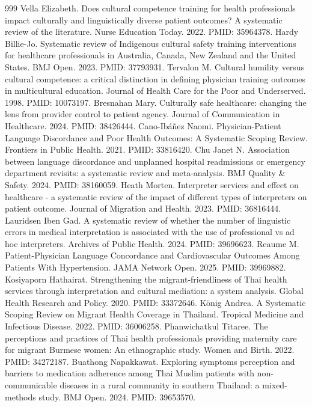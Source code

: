 \begin{thebibliography}{999}
 Vella Elizabeth. Does cultural competence training for health professionals impact culturally and linguistically diverse patient outcomes? A systematic review of the literature. Nurse Education Today. 2022. PMID: 35964378.
 Hardy Billie-Jo. Systematic review of Indigenous cultural safety training interventions for healthcare professionals in Australia, Canada, New Zealand and the United States. BMJ Open. 2023. PMID: 37793931.
 Tervalon M. Cultural humility versus cultural competence: a critical distinction in defining physician training outcomes in multicultural education. Journal of Health Care for the Poor and Underserved. 1998. PMID: 10073197.
 Bresnahan Mary. Culturally safe healthcare: changing the lens from provider control to patient agency. Journal of Communication in Healthcare. 2024. PMID: 38426444.
 Cano-Ibáñez Naomi. Physician-Patient Language Discordance and Poor Health Outcomes: A Systematic Scoping Review. Frontiers in Public Health. 2021. PMID: 33816420.
 Chu Janet N. Association between language discordance and unplanned hospital readmissions or emergency department revisits: a systematic review and meta-analysis. BMJ Quality \& Safety. 2024. PMID: 38160059.
 Heath Morten. Interpreter services and effect on healthcare - a systematic review of the impact of different types of interpreters on patient outcome. Journal of Migration and Health. 2023. PMID: 36816444.
 Lauridsen Iben Gad. A systematic review of whether the number of linguistic errors in medical interpretation is associated with the use of professional vs ad hoc interpreters. Archives of Public Health. 2024. PMID: 39696623.
 Reaume M. Patient-Physician Language Concordance and Cardiovascular Outcomes Among Patients With Hypertension. JAMA Network Open. 2025. PMID: 39969882.
 Kosiyaporn Hathairat. Strengthening the migrant-friendliness of Thai health services through interpretation and cultural mediation: a system analysis. Global Health Research and Policy. 2020. PMID: 33372646.
 König Andrea. A Systematic Scoping Review on Migrant Health Coverage in Thailand. Tropical Medicine and Infectious Disease. 2022. PMID: 36006258.
 Phanwichatkul Titaree. The perceptions and practices of Thai health professionals providing maternity care for migrant Burmese women: An ethnographic study. Women and Birth. 2022. PMID: 34272187.
 Buathong Napakkawat. Exploring symptoms perception and barriers to medication adherence among Thai Muslim patients with non-communicable diseases in a rural community in southern Thailand: a mixed-methods study. BMJ Open. 2024. PMID: 39653570.

\end{thebibliography}
